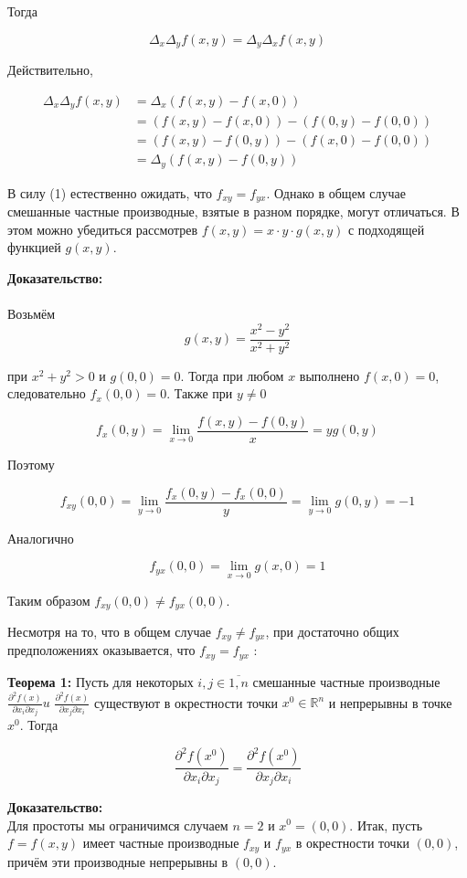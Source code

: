 \documentclass[a4paper,12pt]{article} %
\begin{document}
Тогда

$$
\Delta_{x} \Delta_{y} f(x, y)=\Delta_{y} \Delta_{x} f(x, y)
$$

Действительно,

$$
\begin{aligned}
\Delta_{x} \Delta_{y} f(x, y) & =\Delta_{x}(f(x, y)-f(x, 0)) \\
& =(f(x, y)-f(x, 0))-(f(0, y)-f(0,0)) \\
& =(f(x, y)-f(0, y))-(f(x, 0)-f(0,0)) \\
& =\Delta_{y}(f(x, y)-f(0, y))
\end{aligned}
$$

В силу (1) естественно ожидать, что $f_{x y}=f_{y x}$. Однако в общем случае смешанные частные производные, взятые в разном порядке, могут отличаться. В этом можно убедиться рассмотрев $f(x, y)=x \cdot y \cdot g(x, y)$ с подходящей функцией $g(x, y)$.

\textbf{Доказательство:}\\\\
Возьмём
$$
g(x, y)=\frac{x^{2}-y^{2}}{x^{2}+y^{2}}
$$

при $x^{2}+y^{2}>0$ и $g(0,0)=0$. Тогда при любом $x$ выполнено $f(x, 0)=0$, следовательно $f_{x}(0,0)=0$. Также при $y \neq 0$

$$
f_{x}(0, y)=\lim _{x \rightarrow 0} \frac{f(x, y)-f(0, y)}{x}=y g(0, y)
$$

Поэтому

$$
f_{x y}(0,0)=\lim _{y \rightarrow 0} \frac{f_{x}(0, y)-f_{x}(0,0)}{y}=\lim _{y \rightarrow 0} g(0, y)=-1
$$

Аналогично

$$
f_{y x}(0,0)=\lim _{x \rightarrow 0} g(x, 0)=1
$$

Таким образом $f_{x y}(0,0) \neq f_{y x}(0,0)$.

Несмотря на то, что в общем случае $f_{x y} \neq f_{y x}$, при достаточно общих предположениях оказывается, что $f_{x y}=f_{y x}$ :

\textbf{Теорема 1:} Пусть для некоторых $i, j \in \overline{1, n}$ смешанные частные производные $\frac{\partial^{2} f(x)}{\partial x_{i} \partial x_{j}} u$ $\frac{\partial^{2} f(x)}{\partial x_{j} \partial x_{i}}$ существуют в окрестности точки $x^{0} \in \mathbb{R}^{n}$ и непрерывны в точке $x^{0}$. Тогда

$$
\frac{\partial^{2} f\left(x^{0}\right)}{\partial x_{i} \partial x_{j}}=\frac{\partial^{2} f\left(x^{0}\right)}{\partial x_{j} \partial x_{i}}
$$

\textbf{Доказательство:}\\
Для простоты мы ограничимся случаем $n=2$ и $x^{0}=(0,0)$. Итак, пусть $f=f(x, y)$ имеет частные производные $f_{x y}$ и $f_{y x}$ в окрестности точки $(0,0)$, причём эти производные непрерывны в $(0,0)$.
\end{document}
